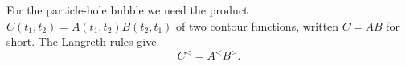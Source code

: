 \documentclass{article}
\begin{document}
For the particle-hole bubble we need the product $C(t_1,t_2) = A(t_1,t_2)B(t_2,t_1)$ of two contour
functions, written $C = AB$ for short. The Langreth rules give
\begin{equation}
C^{<} = A^{<} B^{>} .
\label{eq:bl}
\end{equation}
\end{document}
